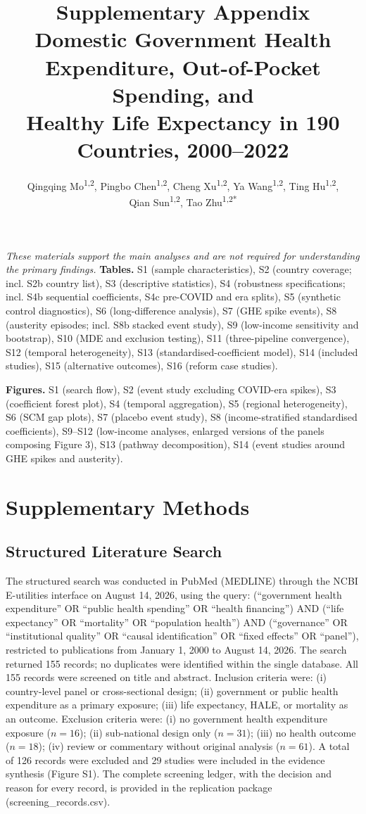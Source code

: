 \documentclass[10pt,a4paper]{article}
\title{\Large\textbf{Supplementary Appendix}\\[6pt]\large Domestic Government Health Expenditure, Out-of-Pocket Spending, and\\ Healthy Life Expectancy in 190 Countries, 2000--2022}
\author{Qingqing Mo\textsuperscript{1,2}, Pingbo Chen\textsuperscript{1,2}, Cheng Xu\textsuperscript{1,2}, Ya Wang\textsuperscript{1,2}, Ting Hu\textsuperscript{1,2},\\ Qian Sun\textsuperscript{1,2}, Tao Zhu\textsuperscript{1,2*}}
\date{\footnotesize\begin{itemize}[leftmargin=*,nosep]
\item 1. Department of Obstetrics and Gynecology, National Clinical Research Center for Obstetrics and Gynecology, Tongji Hospital, Tongji Medical College, Huazhong University of Science and Technology, Wuhan, China
\item 2. Key Laboratory of Cancer Invasion and Metastasis, Ministry of Education, Tongji Hospital, Tongji Medical College, Huazhong University of Science and Technology, Wuhan, China
\item * Correspondence: zhutao@tjh.tjmu.edu.cn
\end{itemize}}
\begin{document}
\maketitle

\noindent\textit{These materials support the main analyses and are not required for understanding the primary findings.}
\textbf{Tables.} S1 (sample characteristics), S2 (country coverage; incl. S2b country list), S3 (descriptive statistics), S4 (robustness specifications; incl. S4b sequential coefficients, S4c pre-COVID and era splits), S5 (synthetic control diagnostics), S6 (long-difference analysis), S7 (GHE spike events), S8 (austerity episodes; incl. S8b stacked event study), S9 (low-income sensitivity and bootstrap), S10 (MDE and exclusion testing), S11 (three-pipeline convergence), S12 (temporal heterogeneity), S13 (standardised-coefficient model), S14 (included studies), S15 (alternative outcomes), S16 (reform case studies).\par
\textbf{Figures.} S1 (search flow), S2 (event study excluding COVID-era spikes), S3 (coefficient forest plot), S4 (temporal aggregation), S5 (regional heterogeneity), S6 (SCM gap plots), S7 (placebo event study), S8 (income-stratified standardised coefficients), S9--S12 (low-income analyses, enlarged versions of the panels composing Figure 3), S13 (pathway decomposition), S14 (event studies around GHE spikes and austerity).

\section{Supplementary Methods}

\subsection{Structured Literature Search}
The structured search was conducted in PubMed (MEDLINE) through the NCBI E-utilities interface on August 14, 2026, using the query: (``government health expenditure'' OR ``public health spending'' OR ``health financing'') AND (``life expectancy'' OR ``mortality'' OR ``population health'') AND (``governance'' OR ``institutional quality'' OR ``causal identification'' OR ``fixed effects'' OR ``panel''), restricted to publications from January 1, 2000 to August 14, 2026. The search returned 155 records; no duplicates were identified within the single database. All 155 records were screened on title and abstract. Inclusion criteria were: (i) country-level panel or cross-sectional design; (ii) government or public health expenditure as a primary exposure; (iii) life expectancy, HALE, or mortality as an outcome. Exclusion criteria were: (i) no government health expenditure exposure ($n = 16$); (ii) sub-national design only ($n = 31$); (iii) no health outcome ($n = 18$); (iv) review or commentary without original analysis ($n = 61$). A total of 126 records were excluded and 29 studies were included in the evidence synthesis (Figure S1). The complete screening ledger, with the decision and reason for every record, is provided in the replication package (screening\_records.csv).
\end{document}
